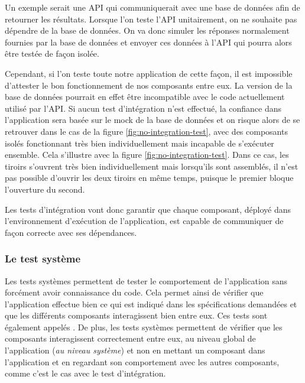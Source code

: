 Un exemple serait une \gls{API} qui communiquerait avec une base de données afin de retourner les résultats. Lorsque l'on teste l'\gls{API} unitairement, on ne souhaite pas dépendre de la base de données. On va donc simuler les réponses normalement fournies par la base de données et envoyer ces données à l'\gls{API} qui pourra alors être testée de façon isolée.

Cependant, si l'on teste toute notre application de cette façon, il est impossible d'attester le bon fonctionnement de nos composants entre eux. La version de la base de données pourrait en effet être incompatible avec le code actuellement utilisé par l'\gls{API}. Si aucun test d'intégration n'est effectué, la confiance dans l'application sera basée sur le \gls{mock} de la base de données et on risque alors de se retrouver dans le cas de la figure \ref{fig:no-integration-test}, avec des composants isolés fonctionnant très bien individuellement mais incapable de s'exécuter ensemble. Cela s'illustre avec la figure \ref{fig:no-integration-test}. Dans ce cas, les tiroirs s'ouvrent très bien individuellement mais lorsqu'ils sont assemblés, il n'est pas possible d'ouvrir les deux tiroirs en même temps, puisque le premier bloque l'ouverture du second.


Les tests d'intégration vont donc garantir que chaque composant, déployé dans l'environnement d'exécution de l'application, est capable de communiquer de façon correcte avec ses dépendances.

\subsubsection{Le test système}

Les tests systèmes permettent de tester le comportement de l'application sans forcément avoir connaissance du code. Cela permet ainsi de vérifier que l'application effectue bien ce qui est indiqué dans les spécifications demandées et que les différents composants interagissent bien entre eux. Ces tests sont également appelés . De plus, les tests systèmes permettent de vérifier que les composants interagissent correctement entre eux, au niveau global de l'application (\emph{au niveau système}) et non en mettant un composant dans l'application et en regardant son comportement avec les autres composants, comme c'est le cas avec le test d'intégration.

